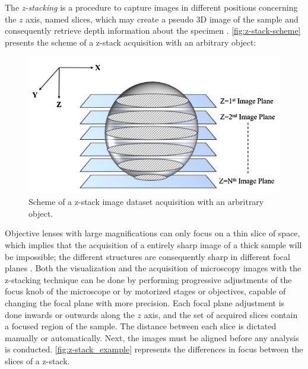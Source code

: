 The \textit{z-stacking} is a procedure to capture images in different positions concerning the $z$ axis, named slices, which may create a pseudo 3D image of the sample and consequently retrieve depth information about the specimen \cite{lawlor2019introduction}. \autoref{fig:z-stack-scheme} presents the scheme of a z-stack acquisition with an arbitrary object:

\begin{figure}[htb]
	\centering
	\caption{\label{fig:z-stack-scheme} Scheme of a z-stack image dataset acquisition with an arbritrary object.}
	\begin{center}
	    \includegraphics[scale=0.4]{images/z-stack-object.png}
	\end{center}
	\centering
\end{figure}

Objective lenses with large magnifications can only focus on a thin slice of space, which implies that the acquisition of a entirely sharp image of a thick sample will be impossible; the different structures are consequently sharp in different focal planes \cite{giusti2011artificial}. Both the visualization and the acquisition of microscopy images with the z-stacking technique can be done by performing progressive adjustments of the focus knob of the microscope or by motorized stages or objectives, capable of changing the focal plane with more precision. Each focal plane adjustment is done inwards or outwards along the $z$ axis, and the set of acquired slices contain a focused region of the sample. The distance between each slice is dictated manually or automatically. Next, the images must be aligned before any analysis is conducted.  \autoref{fig:z-stack_example} represents the differences in focus between the slices of a z-stack.

